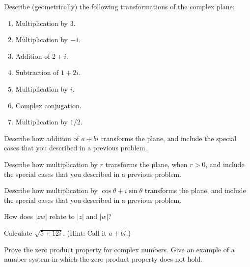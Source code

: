 \documentclass[space,nooutcomes]{ximera}
\begin{document}
\newpage 


\begin{problem}
Describe (geometrically) the following transformations of the complex plane: 
\begin{enumerate}
\item Multiplication by $3$. 
\item Multiplication by $-1$. 
\item Addition of $2 + i$. 
\item Subtraction of $1 + 2i$.  
\item Multiplication by $i$. 
\item Complex conjugation. 
\item Multiplication by $1/2$.  
\end{enumerate}
\vfill 
\end{problem}

\begin{problem}
Describe how addition of $a + bi$ transforms the plane, and include the special cases that you described in a previous problem.
\vfill 
\end{problem}

\begin{problem}
Describe how multiplication by $r$ transforms the plane, when $r > 0$, and include the special cases that you described in a previous problem.  
\vfill 
\end{problem}

\newpage 


\begin{problem}
Describe how multiplication by $\cos\theta + i\sin\theta$ transforms the plane, and include the special cases that you described in a previous problem.
\vfill 
\end{problem}

\begin{problem}
How does $|zw|$ relate to $|z|$ and $|w|$?  
\vfill 
\end{problem}

\begin{problem}
Calculate $\sqrt{5+12i}$.  (Hint: Call it $a + bi$.)  
\vfill 
\end{problem}

\begin{problem}
Prove the zero product property for complex numbers.  Give an example of a number system in which the zero product property does not hold.
\vfill 
\end{problem}

\newpage 
\end{document}
